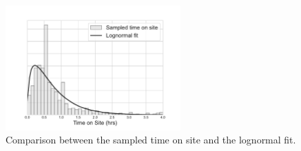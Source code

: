 \documentclass[preprint,12pt]{elsarticle}
\begin{document}
\begin{figure}[ht]
\centering
  \includegraphics[width=0.6\textwidth]{img/time_on_site_fit.pdf}
    \caption{Comparison between the sampled time on site and the lognormal fit.}
  \label{fig:lognorm_fit}
\end{figure}






\end{document}
